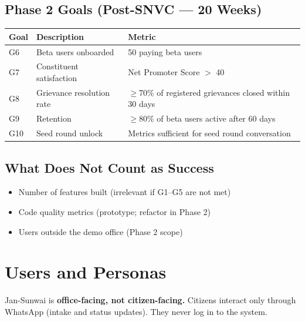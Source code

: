 \documentclass[11pt, a4paper]{article}
\begin{document}
\subsection{Phase 2 Goals (Post-SNVC --- 20 Weeks)}

\begin{tabularx}{\linewidth}{lXl}
\toprule
\textbf{Goal} & \textbf{Description} & \textbf{Metric} \\
\midrule
G6 & Beta users onboarded       & 50 paying beta users \\
G7 & Constituent satisfaction   & Net Promoter Score $>$ 40 \\
G8 & Grievance resolution rate  & $\geq$70\% of registered grievances closed within 30 days \\
G9 & Retention                  & $\geq$80\% of beta users active after 60 days \\
G10 & Seed round unlock         & Metrics sufficient for seed round conversation \\
\bottomrule
\end{tabularx}

\subsection{What Does Not Count as Success}

\begin{itemize}[leftmargin=1.5em]
  \item Number of features built (irrelevant if G1--G5 are not met)
  \item Code quality metrics (prototype; refactor in Phase 2)
  \item Users outside the demo office (Phase 2 scope)
\end{itemize}

\newpage

\section{Users and Personas}

\begin{notebox}
Jan-Sunwai is \textbf{office-facing, not citizen-facing.} Citizens interact only through WhatsApp (intake and status updates). They never log in to the system.
\end{notebox}

\vspace{0.8em}
\end{document}
